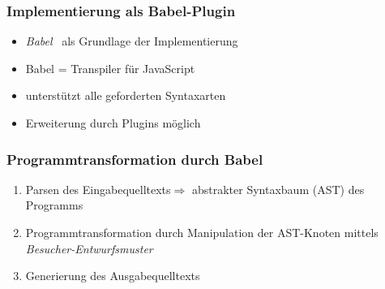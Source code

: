    \begin{frame}
      \frametitle{Implementierung als Babel-Plugin}
      \begin{itemize}
        \item \textit{Babel}~\autocite{BABEL} als Grundlage der Implementierung
        \item Babel = Transpiler für JavaScript
        \item unterstützt alle geforderten Syntaxarten
        \item Erweiterung durch Plugins möglich
      \end{itemize}
    \end{frame}

    \begin{frame}
      \frametitle{Programmtransformation durch Babel}
      \begin{enumerate}
        \item Parsen des Eingabequelltexts\linebreak$\Rightarrow$ abstrakter Syntaxbaum (AST) des Programms
        \item Programmtransformation durch Manipulation der AST-Knoten mittels \textit{Besucher-Entwurfsmuster}
        \item Generierung des Ausgabequelltexts
      \end{enumerate}
    \end{frame}

